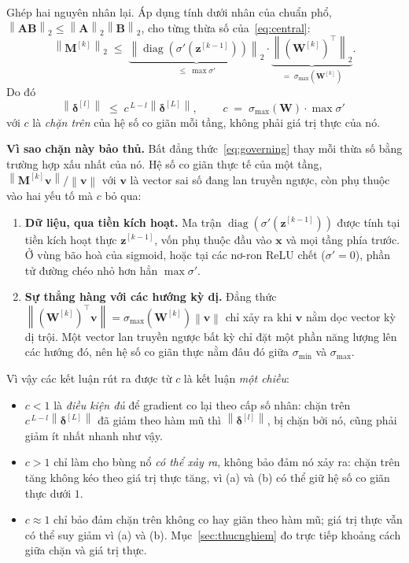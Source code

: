 Ghép hai nguyên nhân lại. Áp dụng tính dưới nhân của chuẩn phổ,
$\left\|\mathbf{A}\mathbf{B}\right\|_2 \le \left\|\mathbf{A}\right\|_2\left\|\mathbf{B}\right\|_2$,
cho từng thừa số của~\eqref{eq:central}:
\[
  \left\|\mathbf{M}^{[k]}\right\|_2
  \;\le\;
  \underbrace{\left\|\operatorname{diag}\!\left(\sigma'(\mathbf{z}^{[k-1]})\right)\right\|_2}_{\le\;\max\sigma'}
  \cdot
  \underbrace{\left\|\left(\mathbf{W}^{[k]}\right)^{\!\top}\right\|_2}_{=\;\sigma_{\max}(\mathbf{W}^{[k]})} .
\]
Do đó
\begin{equation}
  \left\|\boldsymbol{\delta}^{[l]}\right\|
  \;\le\;
  c^{\,L-l}\left\|\boldsymbol{\delta}^{[L]}\right\|,
  \qquad
  \boxed{\;c \;=\; \sigma_{\max}(\mathbf{W}) \cdot \max\sigma'\;}
  \label{eq:governing}
\end{equation}
với $c$ là \emph{chặn trên} của hệ số co giãn mỗi tầng, không phải giá trị thực
của nó.

\textbf{Vì sao chặn này bảo thủ.} Bất đẳng thức~\eqref{eq:governing} thay mỗi
thừa số bằng trường hợp xấu nhất của nó. Hệ số co giãn thực tế của một tầng,
$\left\|\mathbf{M}^{[k]}\mathbf{v}\right\| / \left\|\mathbf{v}\right\|$ với
$\mathbf{v}$ là vector sai số đang lan truyền ngược, còn phụ thuộc vào hai yếu tố
mà $c$ bỏ qua:
\begin{enumerate}[leftmargin=*, itemsep=1pt, label=(\alph*)]
  \item \textbf{Dữ liệu, qua tiền kích hoạt.} Ma trận
    $\operatorname{diag}(\sigma'(\mathbf{z}^{[k-1]}))$ được tính tại tiền kích
    hoạt thực $\mathbf{z}^{[k-1]}$, vốn phụ thuộc đầu vào $\mathbf{x}$ và mọi tầng
    phía trước. Ở vùng bão hoà của sigmoid, hoặc tại các nơ-ron ReLU chết
    ($\sigma'=0$), phần tử đường chéo nhỏ hơn hẳn $\max\sigma'$.
  \item \textbf{Sự thẳng hàng với các hướng kỳ dị.} Đẳng thức
    $\left\|(\mathbf{W}^{[k]})^{\top}\mathbf{v}\right\| = \sigma_{\max}(\mathbf{W}^{[k]})\left\|\mathbf{v}\right\|$
    chỉ xảy ra khi $\mathbf{v}$ nằm dọc vector kỳ dị trội. Một vector lan truyền
    ngược bất kỳ chỉ đặt một phần năng lượng lên các hướng đó, nên hệ số co giãn
    thực nằm đâu đó giữa $\sigma_{\min}$ và $\sigma_{\max}$.
\end{enumerate}

Vì vậy các kết luận rút ra được từ $c$ là kết luận \emph{một chiều}:
\begin{itemize}[leftmargin=*, itemsep=1pt]
  \item $c < 1$ là \emph{điều kiện đủ} để gradient co lại theo cấp số nhân: chặn
    trên $c^{\,L-l}\left\|\boldsymbol{\delta}^{[L]}\right\|$ đã giảm theo hàm mũ
    thì $\left\|\boldsymbol{\delta}^{[l]}\right\|$, bị chặn bởi nó, cũng phải giảm
    ít nhất nhanh như vậy.
  \item $c > 1$ chỉ làm cho bùng nổ \emph{có thể xảy ra}, không bảo đảm nó xảy
    ra: chặn trên tăng không kéo theo giá trị thực tăng, vì (a) và (b) có thể
    giữ hệ số co giãn thực dưới $1$.
  \item $c \approx 1$ chỉ bảo đảm chặn trên không co hay giãn theo hàm mũ; giá
    trị thực vẫn có thể suy giảm vì (a) và (b). Mục~\ref{sec:thucnghiem} đo
    trực tiếp khoảng cách giữa chặn và giá trị thực.
\end{itemize}

